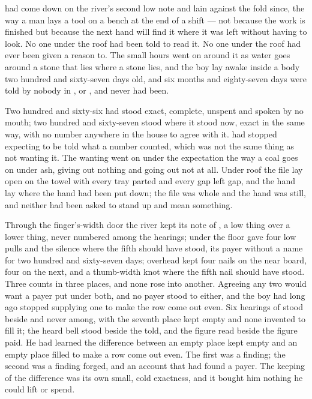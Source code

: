 
 had come down on the river's second low note and lain against the fold since, the way a man lays a tool on a bench at the end of a shift --- not because the work is finished but because the next hand will find it where it was left without having to look. No one under the roof had been told to read it. No one under the roof had ever been given a reason to. The small hours went on around it as water goes around a stone that lies where a stone lies, and the boy lay awake inside a body two hundred and sixty-seven days old, and six months and eighty-seven days were told by nobody in ,  or , and never had been.

Two hundred and sixty-six had stood exact, complete, unspent and spoken by no mouth; two hundred and sixty-seven stood where it stood now, exact in the same way, with no number anywhere in the house to agree with it.  had stopped expecting to be told what a number counted, which was not the same thing as not wanting it. The wanting went on under the expectation the way a coal goes on under ash, giving out nothing and going out not at all. Under  roof the file lay open on the towel with every tray parted and every gap left gap, and the hand lay where the hand had been put down; the file was whole and the hand was still, and neither had been asked to stand up and mean something.

Through the finger's-width door the river kept its note of , a low thing over a lower thing, never numbered among the hearings; under the floor  gave four low pulls and the silence where the fifth should have stood, its payer without a name for two hundred and sixty-seven days; overhead  kept four nails on the near board, four on the next, and a thumb-width knot where the fifth nail should have stood. Three counts in three places, and none rose into another. Agreeing any two would want a payer put under both, and no payer stood to either, and the boy had long ago stopped supplying one to make the row come out even. Six hearings of  stood beside and never among, with the seventh place kept empty and none invented to fill it; the heard bell stood beside the told, and the figure read beside the figure paid. He had learned the difference between an empty place kept empty and an empty place filled to make a row come out even. The first was a finding; the second was a finding forged, and an account that had found a payer. The keeping of the difference was its own small, cold exactness, and it bought him nothing he could lift or spend.

